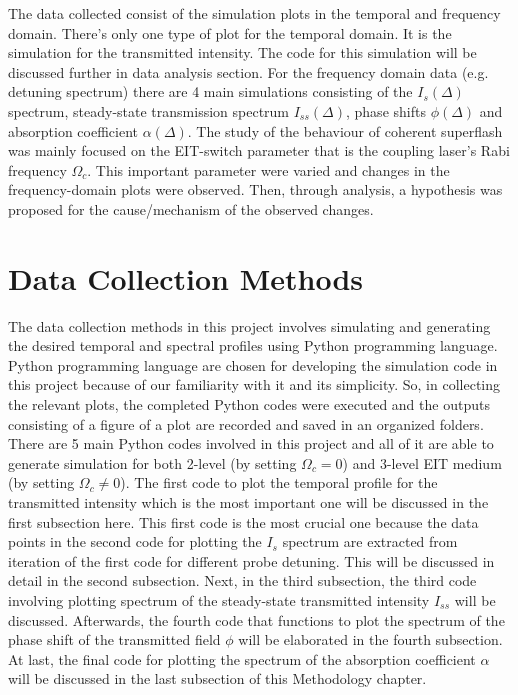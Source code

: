 The data collected consist of the simulation plots in the temporal and frequency domain. There's only one type of plot for the temporal domain. It is the simulation for the transmitted intensity. The code for this simulation will be discussed further in data analysis section. For the frequency domain data (e.g. detuning spectrum) there are 4 main simulations consisting of the $I_{s}(\Delta)$ spectrum, steady-state transmission spectrum $I_{ss}(\Delta)$, phase shifts $\phi(\Delta)$ and absorption coefficient $\alpha(\Delta)$. The study of the behaviour of coherent superflash was mainly focused on the EIT-switch parameter that is the coupling laser's Rabi frequency $\Omega_{c}$. This important parameter were varied and changes in the frequency-domain plots were observed. Then, through analysis, a hypothesis was proposed for the cause/mechanism of the observed changes.


\section{Data Collection Methods}
The data collection methods in this project involves simulating and generating the desired temporal and spectral profiles using Python programming language. Python programming language are chosen for developing the simulation code in this project because of our familiarity with it and its simplicity. So, in collecting the relevant plots, the completed Python codes were executed and the outputs consisting of a figure of a plot are recorded and saved in an organized folders. There are 5 main Python codes involved in this project and all of it are able to generate simulation for both 2-level (by setting $\Omega_{c} = 0$) and 3-level EIT medium (by setting $\Omega_{c} \neq 0$). The first code to plot the temporal profile for the transmitted intensity which is the most important one will be discussed in the first subsection here. This first code is the most crucial one because the data points in the second code for plotting the $I_{s}$ spectrum are extracted from iteration of the first code for different probe detuning. This will be discussed in detail in the second subsection. Next, in the third subsection, the third code involving plotting spectrum of the steady-state transmitted intensity $I_{ss}$ will be discussed. Afterwards, the fourth code that functions to plot the spectrum of the phase shift of the transmitted field $\phi$ will be elaborated in the fourth subsection. At last, the final code for plotting the spectrum of the absorption coefficient $\alpha$ will be discussed in the last subsection of this Methodology chapter.\\

